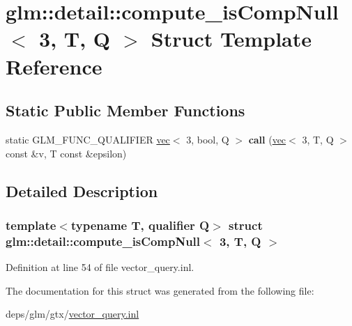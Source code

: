 \hypertarget{structglm_1_1detail_1_1compute__isCompNull_3_013_00_01T_00_01Q_01_4}{}\section{glm\+:\+:detail\+:\+:compute\+\_\+is\+Comp\+Null$<$ 3, T, Q $>$ Struct Template Reference}
\label{structglm_1_1detail_1_1compute__isCompNull_3_013_00_01T_00_01Q_01_4}
\subsection*{Static Public Member Functions}
\begin{DoxyCompactItemize}
\item 
\mbox{\label{structglm_1_1detail_1_1compute__isCompNull_3_013_00_01T_00_01Q_01_4_a2bb0d3fb0e8d0a8c9e4571e92102f1c3}} 
static G\+L\+M\+\_\+\+F\+U\+N\+C\+\_\+\+Q\+U\+A\+L\+I\+F\+I\+ER \hyperlink{structglm_1_1vec}{vec}$<$ 3, bool, Q $>$ {\bfseries call} (\hyperlink{structglm_1_1vec}{vec}$<$ 3, T, Q $>$ const \&v, T const \&epsilon)
\end{DoxyCompactItemize}


\subsection{Detailed Description}
\subsubsection*{template$<$typename T, qualifier Q$>$\newline
struct glm\+::detail\+::compute\+\_\+is\+Comp\+Null$<$ 3, T, Q $>$}



Definition at line 54 of file vector\+\_\+query.\+inl.



The documentation for this struct was generated from the following file\+:\begin{DoxyCompactItemize}
\item 
deps/glm/gtx/\hyperlink{vector__query_8inl}{vector\+\_\+query.\+inl}\end{DoxyCompactItemize}
